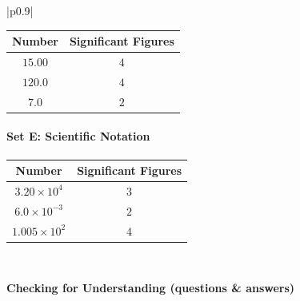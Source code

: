 \documentclass{article}
\begin{document}
\begin{tabular}{|p{0.9\linewidth}|}
\begin{center}
\begin{tabular}{c c}
\textbf{Number} & \textbf{Significant Figures} \\
\hline
$15.00$ & $4$ \\
$120.0$ & $4$ \\
$7.0$ & $2$
\end{tabular}
\end{center}

\paragraph{Set E: Scientific Notation}

\begin{center}
\begin{tabular}{c c}
\textbf{Number} & \textbf{Significant Figures} \\
\hline
$3.20 \times 10^{4}$ & $3$ \\
$6.0 \times 10^{-3}$ & $2$ \\
$1.005 \times 10^{2}$ & $4$
\end{tabular}
\end{center}\\
\hline
\end{tabular}
\newpage

\vspace{0.5cm}
\noindent
{\large \textbf{Checking for Understanding (questions \& answers)}}
\end{document}
